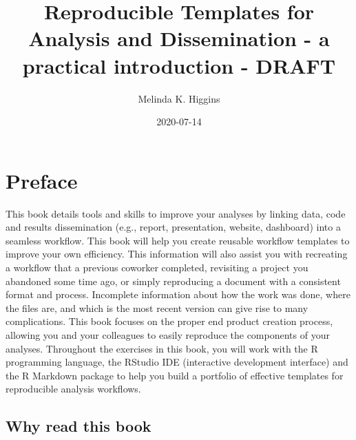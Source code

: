 \documentclass[
]{book}
\title{Reproducible Templates for Analysis and Dissemination - a practical introduction - DRAFT}
\author{Melinda K. Higgins}
\date{2020-07-14}
\begin{document}
\maketitle

{
\setcounter{tocdepth}{1}
\tableofcontents
}
\listoftables
\listoffigures
\hypertarget{preface}{%
\chapter*{Preface}\label{preface}}


This book details tools and skills to improve your analyses by linking data, code and results dissemination (e.g., report, presentation, website, dashboard) into a seamless workflow. This book will help you create reusable workflow templates to improve your own efficiency. This information will also assist you with recreating a workflow that a previous coworker completed, revisiting a project you abandoned some time ago, or simply reproducing a document with a consistent format and process. Incomplete information about how the work was done, where the files are, and which is the most recent version can give rise to many complications. This book focuses on the proper end product creation process, allowing you and your colleagues to easily reproduce the components of your analyses. Throughout the exercises in this book, you will work with the R programming language, the RStudio IDE (interactive development interface) and the R Markdown package to help you build a portfolio of effective templates for reproducible analysis workflows.

\hypertarget{why-read-this-book}{%
\section*{Why read this book}\label{why-read-this-book}}
\end{document}
